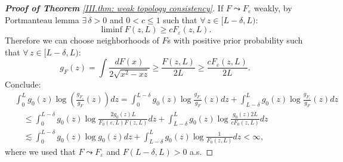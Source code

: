 \begin{proof}[\hypertarget{III.proof consistency in weak topology}{\textbf{Proof of Theorem} \ref{III.thm: weak topology consistency}}]
    If $F \leadsto F_\varepsilon$ weakly, by Portmanteau lemma $\exists \, \delta > 0$ and $0 < c \leq 1$ such that $\forall \, z \in [L - \delta, L)$:
    \begin{equation*}
    \liminf F(z, L) \geq c F_\varepsilon (z, L).
    \end{equation*}
    Therefore we can choose neighborhoods of $F$s with positive prior probability such that $\forall \, z \in [L - \delta, L)$:
    \begin{equation*}
    g_{\scriptscriptstyle{F}}(z) = \int \frac{dF(x)}{2 \sqrt{x^2 - xz}} \geq \frac{F(z, L)}{2L} \geq \frac{c F_\varepsilon (z, L)}{2L}.
    \end{equation*}
    Conclude:
    \begin{align*}
    &\int_0^L g_0(z) \log \left( \frac{g_{\scriptscriptstyle{F_\varepsilon}}}{g_{\scriptscriptstyle{F}}} (z) \right) dz = \int_0^{L-\delta} g_0(z) \log \frac{g_{\scriptscriptstyle{F_\varepsilon}}}{g_{\scriptscriptstyle{F}}} (z) dz + \int_{L - \delta}^L g_0(z) \log \frac{g_{\scriptscriptstyle{F_\varepsilon}}}{g_{\scriptscriptstyle{F}}} (z) dz \\
    &\quad \leq \int_0^{L-\delta} g_0(z) \log \frac{2 g_0(z) L }{F_0(\varepsilon, L)  F(z, L)} dz + \int_{L-\delta}^L g_0(z) \log \frac{g_0(z) 2L}{c F_0(z, L)} dz \\
    &\quad \lesssim \int_0^{L-\delta} g_0(z) \log g_0(z) dz + \int_{L-\delta}^L g_0(z) \log \frac{1}{F_0(z, L)} dz < \infty,
    \end{align*}
    where we used that $F \leadsto F_\varepsilon$ and $F(L - \delta, L) > 0$ a.s.
\end{proof}

